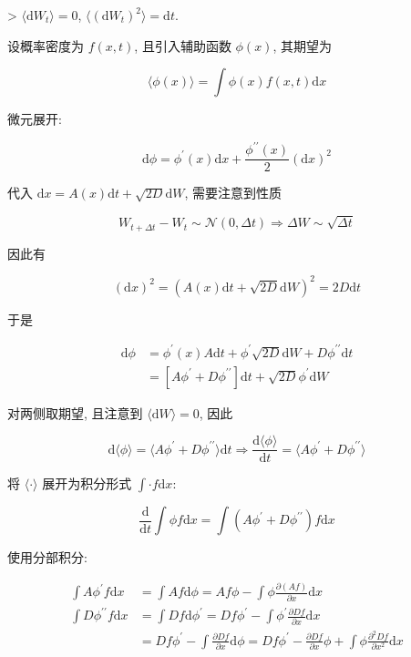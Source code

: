 \documentclass[../../main.tex]{subfiles}
\begin{document}
\begin{enumerate}
{{> $\langle\mathrm{d}W_{t}\rangle = 0$, $\langle(\mathrm{d}W_{t})^{2}\rangle = \mathrm{d}t$. 

设概率密度为 $f(x,t)$, 且引入辅助函数 $\phi(x)$, 其期望为

$$
\langle \phi(x)\rangle = \int \phi(x)f(x,t)\mathrm{d}x
$$

微元展开:

$$
\mathrm{d}\phi = \phi^{\prime}(x)\mathrm{d}x + \frac{\phi^{\prime\prime}(x)}{2}(\mathrm{d}x)^{2}
$$

代入 $\mathrm{d}x = A(x)\mathrm{d}t + \sqrt{2D}\mathrm{d}W$, 需要注意到性质

$$
W_{t+\Delta t} - W_{t}\sim \mathcal{N}(0,\Delta t)\Rightarrow \Delta W\sim\sqrt{\Delta t}
$$

因此有 

$$
(\mathrm{d}x)^{2} = (A(x)\mathrm{d}t + \sqrt{2D}\mathrm{d}W)^{2} = 2D\mathrm{d}t
$$

于是

$$
\begin{aligned}
\mathrm{d}\phi &= \phi^{\prime}(x)A\mathrm{d}t + \phi^{\prime}\sqrt{2D}\mathrm{d}W + D\phi^{\prime\prime}\mathrm{d}t\\
&= \left[A\phi^{\prime} + D\phi^{\prime\prime}\right]\mathrm{d}t + \sqrt{2D}\phi^{\prime}\mathrm{d}W
\end{aligned}
$$

对两侧取期望, 且注意到 $\langle \mathrm{d}W\rangle = 0$, 因此

$$
\mathrm{d}\langle\phi\rangle = \langle A\phi^{\prime} + D\phi^{\prime\prime}\rangle \mathrm{d}t \Rightarrow \frac{\mathrm{d}\langle\phi\rangle}{\mathrm{d}t} = \langle A\phi^{\prime} + D\phi^{\prime\prime}\rangle
$$

将 $\langle \cdot\rangle$ 展开为积分形式 $\int \cdot f\mathrm{d}x$: 

$$
\frac{\mathrm{d}}{\mathrm{d}t} \int\phi f\mathrm{d}x = \int (A\phi^{\prime} + D\phi^{\prime\prime})f\mathrm{d}x
$$

使用分部积分: 

$$
\begin{aligned}
\int A\phi^{\prime}f\mathrm{d}x &= \int Af \mathrm{d}\phi = Af\phi - \int \phi \frac{\partial(Af)}{\partial x}\mathrm{d}x\\
\int D\phi^{\prime\prime}f\mathrm{d}x &= \int Df\mathrm{d}\phi^{\prime} = Df\phi^{\prime} - \int \phi^{\prime}\frac{\partial Df}{\partial x}\mathrm{d}x\\
&= Df\phi^{\prime} - \int \frac{\partial Df}{\partial x}\mathrm{d}\phi = Df\phi^{\prime} - \frac{\partial D f}{\partial x}\phi + \int \phi \frac{\partial^{2}Df}{\partial x^{2}}\mathrm{d}x
\end{aligned}
$$

}}
\end{enumerate}
\end{document}

